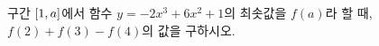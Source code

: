 구간 $[1{,}\mkern3mu\mathopen{}a]$에서 함수 $y=-2x^3+6x^2+1$의 최솟값을 $f(a)$라 할 때, $f(2)+f(3)-f(4)$의 값을 구하시오. 
